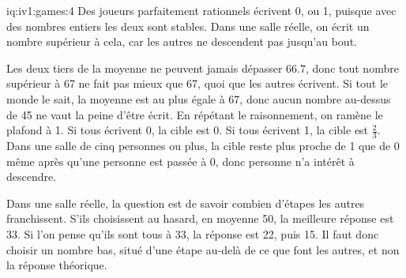 \begin{solution}{iq:iv1:games:4}
Des joueurs parfaitement rationnels écrivent 0, ou 1, puisque avec des nombres entiers les deux sont stables. Dans une salle réelle, on écrit un nombre supérieur à cela, car les autres ne descendent pas jusqu'au bout.

Les deux tiers de la moyenne ne peuvent jamais dépasser $66.7$, donc tout nombre supérieur à 67 ne fait pas mieux que 67, quoi que les autres écrivent. Si tout le monde le sait, la moyenne est au plus égale à 67, donc aucun nombre au-dessus de 45 ne vaut la peine d'être écrit. En répétant le raisonnement, on ramène le plafond à 1. Si tous écrivent 0, la cible est 0. Si tous écrivent 1, la cible est $\tfrac23$. Dans une salle de cinq personnes ou plus, la cible reste plus proche de 1 que de 0 même après qu'une personne est passée à 0, donc personne n'a intérêt à descendre.

Dans une salle réelle, la question est de savoir combien d'étapes les autres franchissent. S'ils choisissent au hasard, en moyenne 50, la meilleure réponse est 33. Si l'on pense qu'ils sont tous à 33, la réponse est 22, puis 15. Il faut donc choisir un nombre bas, situé d'une étape au-delà de ce que font les autres, et non la réponse théorique.

\end{solution}


